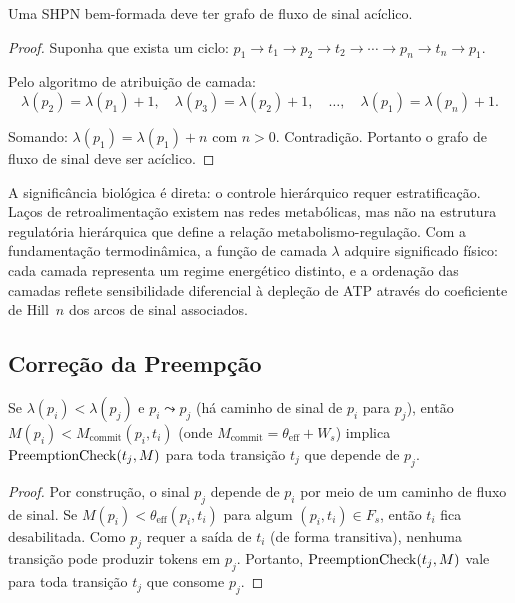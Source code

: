 \begin{theorem}
\label{thm:aciclicidade}
Uma SHPN bem-formada deve ter grafo de fluxo de sinal acíclico.
\end{theorem}

\begin{proof}
Suponha que exista um ciclo: $p_1 \to t_1 \to p_2 \to t_2 \to \cdots \to
p_n \to t_n \to p_1$.

Pelo algoritmo de atribuição de camada:
\[
\lambda(p_2) = \lambda(p_1) + 1,\quad \lambda(p_3) = \lambda(p_2) + 1,\quad
\ldots,\quad \lambda(p_1) = \lambda(p_n) + 1.
\]

Somando: $\lambda(p_1) = \lambda(p_1) + n$ com $n > 0$. Contradição. Portanto o
grafo de fluxo de sinal deve ser acíclico.
\end{proof}

A significância biológica é direta: o controle hierárquico requer estratificação.
Laços de retroalimentação existem nas redes metabólicas, mas não na estrutura
regulatória hierárquica que define a relação metabolismo-regulação.
Com a fundamentação termodinâmica, a função de camada $\lambda$ adquire
significado físico: cada camada representa um regime energético distinto,
e a ordenação das camadas reflete sensibilidade diferencial à depleção de ATP
através do coeficiente de Hill~$n$ dos arcos de sinal associados.

\subsection{Correção da Preempção}
\label{subsec:corretude-preempcao}

\begin{theorem}
\label{thm:preempcao}
Se $\lambda(p_i) < \lambda(p_j)$ e $p_i \leadsto p_j$ (há caminho de sinal de
$p_i$ para $p_j$), então $M(p_i) < M_{\text{commit}}(p_i, t_i)$
(onde $M_{\text{commit}} = \theta_{\mathrm{eff}} + W_s$) implica
$\operatorname{PreemptionCheck}(t_j, M)$ para toda transição $t_j$ que depende de $p_j$.
\end{theorem}

\begin{proof}
Por construção, o sinal $p_j$ depende de $p_i$ por meio de um caminho de fluxo de
sinal. Se $M(p_i) < \theta_{\mathrm{eff}}(p_i,t_i)$ para algum $(p_i, t_i) \in F_s$, então $t_i$
fica desabilitada. Como $p_j$ requer a saída de $t_i$ (de forma transitiva),
nenhuma transição pode produzir tokens em $p_j$. Portanto,
$\operatorname{PreemptionCheck}(t_j, M)$ vale para toda transição $t_j$ que consome $p_j$.
\end{proof}

